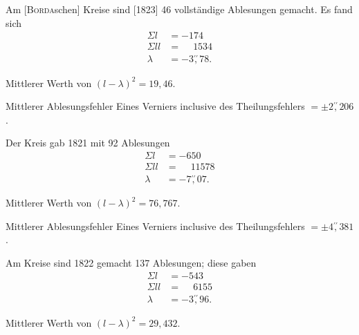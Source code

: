 \par\bigskip
\par\noindent\hspace*{\parindent}Am [\textsc{Borda}schen] Kreise sind [1823] 46 vollständige Ablesungen gemacht. Es fand sich
\[
\begin{aligned}
\Sigma l&=-174\\
\Sigma ll&=\phantom{-}1534\\
\lambda&=-3\overset{\prime\prime}{,}78.
\end{aligned}
\]
\par\noindent\hspace*{\parindent}Mittlerer Werth von $(l-\lambda)^2=19{,}46$.
\par\noindent\hspace*{\parindent}Mittlerer Ablesungsfehler Eines Verniers inclusive des Theilungsfehlers $=\pm2\overset{\prime\prime}{,}206$.
\par\noindent\hspace*{\parindent}Der Kreis gab 1821 mit 92 Ablesungen
\[
\begin{aligned}
\Sigma l&=-650\\
\Sigma ll&=\phantom{-}11578\\
\lambda&=-7\overset{\prime\prime}{,}07.
\end{aligned}
\]
\par\noindent\hspace*{\parindent}Mittlerer Werth von $(l-\lambda)^2=76{,}767$.
\par\noindent\hspace*{\parindent}Mittlerer Ablesungsfehler Eines Verniers inclusive des Theilungsfehlers $=\pm4\overset{\prime\prime}{,}381$.
\par\noindent\hspace*{\parindent}Am Kreise sind 1822 gemacht 137 Ablesungen; diese gaben
\[
\begin{aligned}
\Sigma l&=-543\\
\Sigma ll&=\phantom{-}6155\\
\lambda&=-3\overset{\prime\prime}{,}96.
\end{aligned}
\]
\par\noindent\hspace*{\parindent}Mittlerer Werth von $(l-\lambda)^2=29{,}432$.


